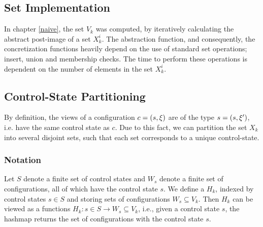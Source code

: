 

\subsection{Set Implementation}
In chapter \ref{naive}, the set $V_k$ was computed, by iteratively calculating the abstract post-image of a set $X_k^i$. The abstraction function, and consequently, the concretization functions heavily depend on the use of standard set operations; insert, union and membership checks. The time to perform these operations is dependent on the number of elements in the set $X_k^i$.


\subsection{Control-State Partitioning}
By definition, the views of a configuration $c = (s, \xi)$ are of the type $s = (s, \xi')$, i.e. have the same control state as $c$. Due to this fact, we can partition the set $X_k$ into several disjoint sets, such that each set corresponds to a unique control-state.

\subsubsection{Notation}
Let $S$ denote a finite set of control states and $W_s$ denote a finite set of configurations, all of which have the control state $s$. We define a  $H_k$, indexed by control states $s \in S$ and storing sets of configurations $W_s \subseteq V_k$. Then $H_k$ can be viewed as a functions $H_k : s \in S \rightarrow W_s \subseteq V_k$, i.e., given a control state $s$, the hashmap returns the set of configurations with the control state $s$. 

